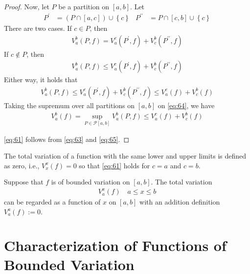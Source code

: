 \documentclass[thmcnt=section, 12pt]{elegantbook}
\begin{document}
\begin{proof}
    \par Now, let $P$ be a partition on $[a, b]$. Let
    \begin{align*}
        P^\prime &= (P \cap [a, c]) \cup \left\{c\right\} & 
        P^{\prime\prime} &= P \cap [c, b] \cup \left\{c\right\}
    \end{align*}
    There are two cases. If $c \in P$, then
    \begin{align*}
        V_a^b(P, f) 
        = V_a^c(P^\prime, f) + V_c^b(P^{\prime\prime}, f)
    \end{align*}
    If $c \notin P$, then 
    \begin{align*}
        V_a^b(P, f) 
        \leq V_a^c(P^\prime, f) + V_c^b(P^{\prime\prime}, f)
    \end{align*}
    Either way, it holds that 
    \begin{align}
        V_a^b(P, f) 
        \leq V_a^c(P^\prime, f) + V_c^b(P^{\prime\prime}, f)
        \leq V_a^c(f) + V_c^b(f)
        \label{eq:64}
    \end{align}
    Taking the supremum over all partitions on $[a, b]$ on \eqref{eq:64}, we have 
    \begin{align}
        V_a^b(f)
        = \sup_{P \in \mathcal{P}[a, b]} V_a^b(P, f) 
        \leq V_a^c(f) + V_c^b(f)
        \label{eq:65}
    \end{align}

    \par \eqref{eq:61} follows from \eqref{eq:63} and \eqref{eq:65}.
\end{proof}

\par The total variation of a function with the same lower and upper limits is defined as zero, i.e.,  $V_x^x(f) = 0$ so that \eqref{eq:61} holds for $c = a$ and $c = b$.

\begin{definition} \label{def:8}
    Suppose that $f$ is of bounded variation on $[a, b]$. The total variation
    \begin{align*}
        V_a^x(f) \quad a \leq x \leq b
    \end{align*}
    can be regarded as a function of $x$ on $[a, b]$ with an addition definition $V_a^a(f) := 0$.
\end{definition}


\section{Characterization of Functions of Bounded Variation}
\end{document}
